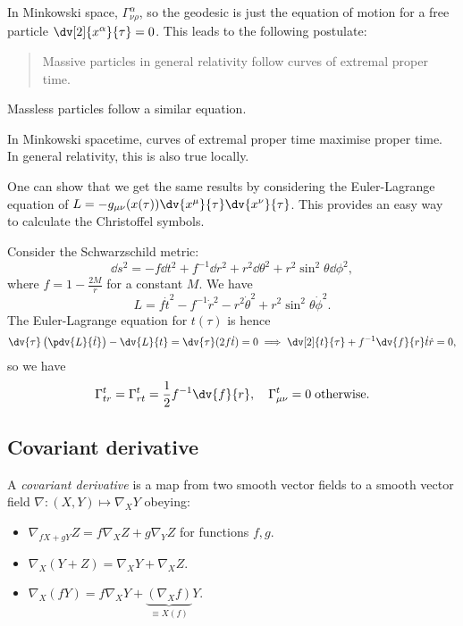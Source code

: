 \documentclass{jknotes}
\begin{document}
In Minkowski space, \(\Gamma^\alpha_{\nu\rho}\), so the geodesic is just the equation of motion for a free particle \(\dv[2]{x^\alpha}{\tau} = 0\). This leads to the following postulate:
\begin{quote}
    Massive particles in general relativity follow curves of extremal proper time.
\end{quote}
Massless particles follow a similar equation.

In Minkowski spacetime, curves of extremal proper time maximise proper time. In general relativity, this is also true locally.

One can show that we get the same results by considering the Euler-Lagrange equation of \(L = -g_{\mu\nu}(x(\tau))\dv{x^\mu}{\tau}\dv{x^\nu}{\tau}\). This provides an easy way to calculate the Christoffel symbols.

\begin{eg}
    Consider the Schwarzschild metric:
    \begin{equation}
        \dd{s}^2 = -f\dd{t}^2 + f^{-1}\dd{r}^2 + r^2\dd{\theta}^2 + r^2\sin^2\theta\dd{\phi}^2,
    \end{equation}
    where \(f = 1 - \frac{2M}{r}\) for a constant \(M\). We have
    \begin{equation}
        L = f\dot{t}^2 - f^{-1}\dot{r}^2 - r^2\dot{\theta}^2 + r^2\sin^2\theta\dot{\phi}^2.
    \end{equation}
    The Euler-Lagrange equation for \(t(\tau)\) is hence
    \begin{equation}
        \dv{\tau}\left(\pdv{L}{\dot{t}}\right)-\dv{L}{t} = \dv{\tau}(2f\dot{t}) = 0 \implies \dv[2]{t}{\tau} + f^{-1}\dv{f}{r}\dot{t}\dot{r} = 0,
    \end{equation}
    so we have
    \begin{equation}
        \Gamma^t_{tr} = \Gamma^t_{rt} = \frac12 f^{-1}\dv{f}{r},\quad \Gamma^t_{\mu\nu} = 0\;\text{otherwise}.
    \end{equation}
\end{eg}

\subsection{Covariant derivative}
\begin{defn}
    A \emph{covariant derivative} is a map from two smooth vector fields to a smooth vector field \(\nabla:(X,Y)\mapsto \nabla_X Y\) obeying:
    \begin{itemize}
        \item \(\nabla_{fX+gY}Z = f\nabla_XZ + g\nabla_YZ\) for functions \(f,g\).
        \item \(\nabla_X(Y+Z) = \nabla_XY + \nabla_XZ\).
        \item \(\nabla_X(fY) = f\nabla_XY + \underbrace{(\nabla_Xf)}_{\equiv X(f)}Y\).
    \end{itemize}
\end{defn}
\end{document}
